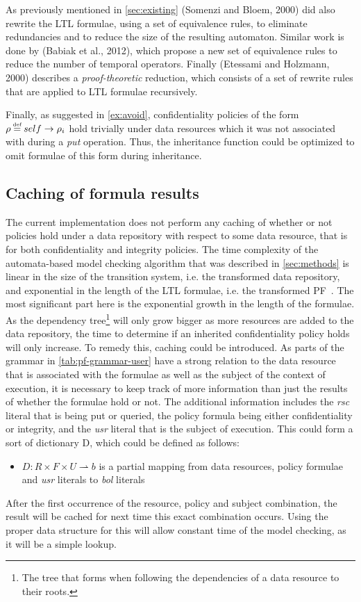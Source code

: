 As previously mentioned in \autoref{sec:existing} (Somenzi and Bloem, 2000)\cite{somenzi2000efficient} did also rewrite the LTL formulae, using a set of equivalence rules, to eliminate redundancies and to reduce the size of the resulting automaton. Similar work is done by (Babiak et al., 2012)\cite{babiak2012ltl}, which propose a new set of equivalence rules to reduce the number of temporal operators. Finally (Etessami and Holzmann, 2000)\cite{etessami2000optimizing} describes a \emph{proof-theoretic} reduction, which consists of a set of rewrite rules that are applied to LTL formulae recursively.

Finally, as suggested in \autoref{ex:avoid}, confidentiality policies of the form $\conf \eqdef self \imply \conf_i$ hold trivially under data resources which it was not associated with during a \emph{put} operation. Thus, the inheritance function could be optimized to omit formulae of this form during inheritance.

\subsection{Caching of formula results}\label{sec:cache}
The current implementation does not perform any caching of whether or not policies hold under a data repository with respect to some data resource, that is for both confidentiality and integrity policies. The time complexity of the automata-based model checking algorithm that was described in \autoref{sec:methods} is linear in the size of the transition system, i.e. the transformed data repository, and exponential in the length of the LTL formulae, i.e. the transformed PF~\cite{baier2008principles}. The most significant part here is the exponential growth in the length of the formulae. As the dependency tree\footnote{The tree that forms when following the dependencies of a data resource to their roots.} will only grow bigger as more resources are added to the data repository, the time to determine if an inherited confidentiality policy holds will only increase. To remedy this, caching could be introduced. As parts of the grammar in \autoref{tab:pf-grammar-user} have a strong relation to the data resource that is associated with the formulae as well as the subject of the context of execution, it is necessary to keep track of more information than just the results of whether the formulae hold or not. The additional information includes the \emph{rsc} literal that is being put or queried, the policy formula being either confidentiality or integrity, and the \emph{usr} literal that is the subject of execution. This could form a sort of dictionary D, which could be defined as follows:
\begin{itemize}
    \item $D : R \times F \times U \rightharpoonup b$ is a partial mapping from data resources, policy formulae and \emph{usr} literals to \emph{bol} literals
\end{itemize}
After the first occurrence of the resource, policy and subject combination, the result will be cached for next time this exact combination occurs. Using the proper data structure for this will allow constant time of the model checking, as it will be a simple lookup.